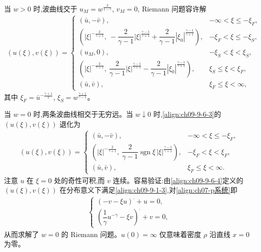 \documentclass[../../main.tex]{subfiles}
\begin{document}
当 $w>0$ 时,波曲线交于 $u_{M}=w^{\frac{2}{1-\gamma}}$, $v_{M}=0$, Riemann 问题容许解
\begin{align}
(u(\xi),v(\xi))=
\begin{cases}
(\bar{u},-\bar{v}),&-\infty<\xi\leqslant-\xi_{F},\\[1mm]
\left(|\xi|^{-\frac{2}{\gamma+1}},\ -\dfrac{2}{\gamma-1}|\xi|^{\frac{\gamma-1}{\gamma+1}}+\dfrac{2}{\gamma-1}|\xi_{0}|^{\frac{\gamma-1}{\gamma+1}}\right),&-\xi_{F}<\xi\leqslant-\xi_{S},\\[2mm]
(u_{M},0),&-\xi_{S}<\xi<\xi_{S},\\[1mm]
\left(|\xi|^{-\frac{2}{\gamma+1}},\ \dfrac{2}{\gamma-1}|\xi|^{\frac{\gamma-1}{\gamma+1}}-\dfrac{2}{\gamma-1}|\xi_{0}|^{\frac{\gamma-1}{\gamma+1}}\right),&\xi_{S}\leqslant\xi<\xi_{F},\\[2mm]
(\bar{u},\bar{v}),&\xi_{F}\leqslant\xi<\infty,
\end{cases}
\label{align:ch09-9-6-3}
\end{align}
其中 $\xi_{F}=\bar{u}^{-\frac{\gamma+1}{2}}$, $\xi_{S}=w^{\frac{\gamma+1}{\gamma-1}}$。

当 $w=0$ 时,两条波曲线相交于无穷远。当 $w\downarrow0$ 时,\eqref{align:ch09-9-6-3}的 $(u(\xi),v(\xi))$ 退化为
\begin{align}
(u(\xi),v(\xi))=
\begin{cases}
(\bar{u},-\bar{v}),&-\infty<\xi\leqslant-\xi_{F},\\[1mm]
\left(|\xi|^{-\frac{2}{\gamma+1}},\ \dfrac{2}{\gamma-1}\operatorname{sgn}\xi\,|\xi|^{\frac{\gamma-1}{\gamma+1}}\right),&-\xi_{F}<\xi<\xi_{F},\\[2mm]
(\bar{u},\bar{v}),&\xi_{F}\leqslant\xi<\infty.
\end{cases}
\label{align:ch09-9-6-4}
\end{align}
注意 $u$ 在 $\xi=0$ 处的奇性可积,而 $v$ 连续。容易验证:由\eqref{align:ch09-9-6-4}定义的 $(u(\xi),v(\xi))$ 在分布意义下满足\eqref{align:ch09-9-1-3},对\eqref{align:ch07-p系统}即
\begin{align}
\begin{cases}
(-v-\xi u)^{\cdot}+u=0,\\[1mm]
\left(\dfrac{1}{\gamma}u^{-\gamma}-\xi v\right)^{\cdot}+v=0,
\end{cases}
\label{align:ch09-9-6-5}
\end{align}
从而求解了 $w=0$ 的 Riemann 问题。$u(0)=\infty$ 仅意味着密度 $\rho$ 沿直线 $x=0$ 为零。
\end{document}
